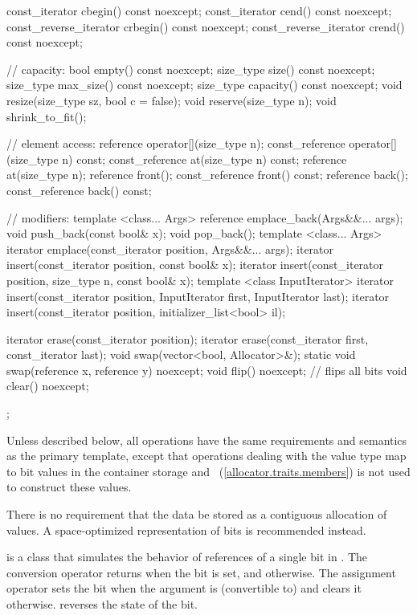 \begin{codeblock}
{{    const_iterator         cbegin() const noexcept;
    const_iterator         cend() const noexcept;
    const_reverse_iterator crbegin() const noexcept;
    const_reverse_iterator crend() const noexcept;

    // capacity:
    bool      empty() const noexcept;
    size_type size() const noexcept;
    size_type max_size() const noexcept;
    size_type capacity() const noexcept;
    void      resize(size_type sz, bool c = false);
    void      reserve(size_type n);
    void      shrink_to_fit();

    // element access:
    reference       operator[](size_type n);
    const_reference operator[](size_type n) const;
    const_reference at(size_type n) const;
    reference       at(size_type n);
    reference       front();
    const_reference front() const;
    reference       back();
    const_reference back() const;

    // modifiers:
    template <class... Args> reference emplace_back(Args&&... args);
    void push_back(const bool& x);
    void pop_back();
    template <class... Args> iterator emplace(const_iterator position, Args&&... args);
    iterator insert(const_iterator position, const bool& x);
    iterator insert(const_iterator position, size_type n, const bool& x);
    template <class InputIterator>
      iterator insert(const_iterator position,
                      InputIterator first, InputIterator last);
    iterator insert(const_iterator position, initializer_list<bool> il);

    iterator erase(const_iterator position);
    iterator erase(const_iterator first, const_iterator last);
    void swap(vector<bool, Allocator>&);
    static void swap(reference x, reference y) noexcept;
    void flip() noexcept;       // flips all bits
    void clear() noexcept;
  };
}
\end{codeblock}%

\pnum
Unless described below, all operations have the same requirements and
semantics as the primary  template, except that operations
dealing with the  value type map to bit values in the
container storage and
~(\ref{allocator.traits.members})
is not used to construct these values.

\pnum
There is no requirement that the data be stored as a contiguous allocation
of  values. A space-optimized representation of bits is
recommended instead.

\pnum
{}
is a class that simulates the behavior of references of a single bit in
. The conversion operator returns 
when the bit is set, and  otherwise. The assignment operator
sets the bit when the argument is (convertible to)  and
clears it otherwise.  reverses the state of the bit.

